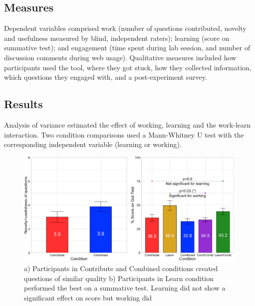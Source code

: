 \subsection*{Measures}
Dependent variables comprised work (number of questions contributed, novelty and usefulness measured by blind, independent raters); learning (score on summative test); and engagement (time spent during lab session, and number of discussion comments during web usage). Qualitative measures included how participants used the tool, where they got stuck, how they collected information, which questions they engaged with, and a post-experiment survey.

\subsection*{Results}
Analysis of variance estimated the effect of working, learning and the work-learn interaction. Two condition comparisons used a Mann-Whitney U test with the corresponding independent variable (learning or working). 


\begin{figure}[h] 
  \centering
  \includegraphics[width=1.0\textwidth]{figures/gutinstinct/gi-7.png}
  \caption[Results: Question quality and learning score]
{a) Participants in Contribute and Combined conditions created questions of similar quality b) Participants in Learn condition performed the best on a summative test. Learning did not show a significant effect on score but working did }
  \label{fig:gi-7}
\end{figure}

